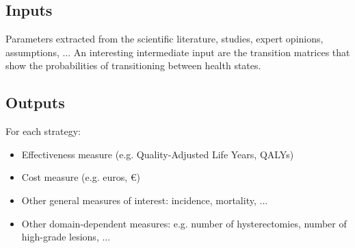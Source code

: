 \subsection{Inputs}
Parameters extracted from the scientific literature, studies, expert opinions, assumptions, ... An interesting intermediate input are the transition matrices that show the probabilities of transitioning between health states.

\subsection{Outputs}
For each strategy:
\begin{itemize}
\item Effectiveness measure (e.g. Quality-Adjusted Life Years, QALYs)
\item Cost measure (e.g. euros, €)
\item Other general measures of interest: incidence, mortality, ...
\item Other domain-dependent measures: e.g. number of hysterectomies, number of high-grade lesions, ...
\end{itemize}



